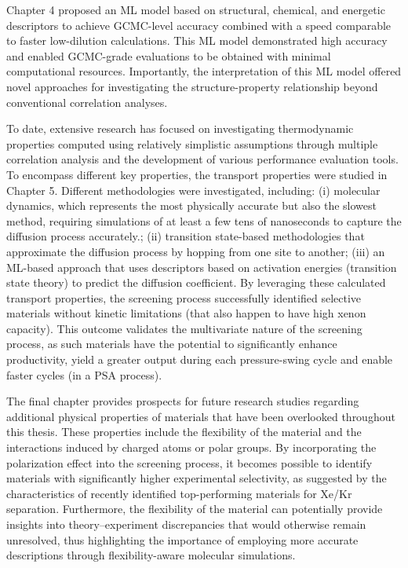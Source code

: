 Chapter 4 proposed an ML model based on structural, chemical, and energetic descriptors to achieve GCMC-level accuracy combined with a speed comparable to faster low-dilution calculations.\autocite{Ren_2023_ml} This ML model demonstrated high accuracy and enabled GCMC-grade evaluations to be obtained with minimal computational resources. Importantly, the interpretation of this ML model offered novel approaches for investigating the structure-property relationship beyond conventional correlation analyses.

To date, extensive research has focused on investigating thermodynamic properties computed using relatively simplistic assumptions through multiple correlation analysis and the development of various performance evaluation tools. To encompass different key properties, the transport properties were studied in Chapter 5. Different methodologies were investigated, including: (i) molecular dynamics, which represents the most physically accurate but also the slowest method, requiring simulations of at least a few tens of nanoseconds to capture the diffusion process accurately.; (ii) transition state-based methodologies that approximate the diffusion process by hopping from one site to another; (iii) an ML-based approach that uses descriptors based on activation energies (transition state theory) to predict the diffusion coefficient. By leveraging these calculated transport properties, the screening process successfully identified selective materials without kinetic limitations (that also happen to have high xenon capacity). This outcome validates the multivariate nature of the screening process, as such materials have the potential to significantly enhance productivity, yield a greater output during each pressure-swing cycle and enable faster cycles (in a PSA process). 

The final chapter provides prospects for future research studies regarding additional physical properties of materials that have been overlooked throughout this thesis. These properties include the flexibility of the material and the interactions induced by charged atoms or polar groups. By incorporating the polarization effect into the screening process, it becomes possible to identify materials with significantly higher experimental selectivity, as suggested by the characteristics of recently identified top-performing materials for Xe/Kr separation.\autocite{Li_2019,Pei_2022} Furthermore, the flexibility of the material can potentially provide insights into theory--experiment discrepancies that would otherwise remain unresolved, thus highlighting the importance of employing more accurate descriptions through flexibility-aware molecular simulations.

